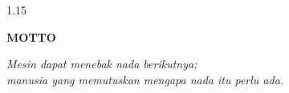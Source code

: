 \newpage
{}
{}
\begin{spacing}{1.15}
\begin{center}
    \textbf{MOTTO}
\end{center}
\vspace*{\fill}
\begin{center}
\begin{minipage}{0.75\textwidth}
\centering
\itshape
Mesin dapat menebak nada berikutnya;\\
manusia yang memutuskan mengapa nada itu perlu ada.
\end{minipage}
\end{center}
\vspace*{\fill}
\end{spacing}
